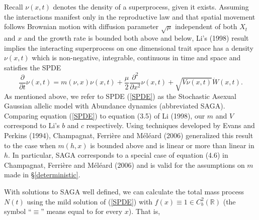 \documentclass[]{article}
\begin{document}
Recall \(\nu(x,t)\) denotes the density of a superprocess, given it
exists. Assuming the interactions manifest only in the reproductive law
and that spatial movement follows Brownian motion with diffusion
parameter \(\sqrt\mu\) independent of both \(X_t\) and \(x\) and the
growth rate is bounded both above and below, Li's (1998) result implies
the interacting superprocess on one dimensional trait space has a
density \(\nu(x,t)\) which is non-negative, integrable, continuous in
time and space and satisfies the SPDE \begin{equation}\label{SPDE}
\frac{\partial}{\partial t}\nu(x,t)=m(\nu,x)\nu(x,t)+\frac{\mu}{2}\frac{\partial^2}{\partial x^2}\nu(x,t)+\sqrt{V\nu(x,t)}\dot W(x,t).
\end{equation} As mentioned above, we refer to SPDE (\ref{SPDE}) as the
Stochastic Asexual Gaussian allelic model with Abundance dynamics
(abbreviated SAGA). Comparing equation (\ref{SPDE}) to equation (3.5) of
Li (1998), our \(m\) and \(V\) correspond to Li's \(b\) and \(c\)
respectively. Using techniques developed by Evans and Perkins (1994),
Champagnat, Ferrière and Méléard (2006) generalized this result to the
case when \(m(h,x)\) is bounded above and is linear or more than linear
in \(h\). In particular, SAGA corresponds to a special case of equation
(4.6) in Champagnat, Ferrière and Méléard (2006) and is valid for the
assumptions on \(m\) made in \S\ref{deterministic}.

With solutions to SAGA well defined, we can calculate the total mass
process \(N(t)\) using the mild solution of (\ref{SPDE}) with
\(f(x)\equiv1\in C_b^2(\mathbb{R})\) (the symbol ``\(\equiv\)'' means
equal to for every \(x\)). That is,
\end{document}
